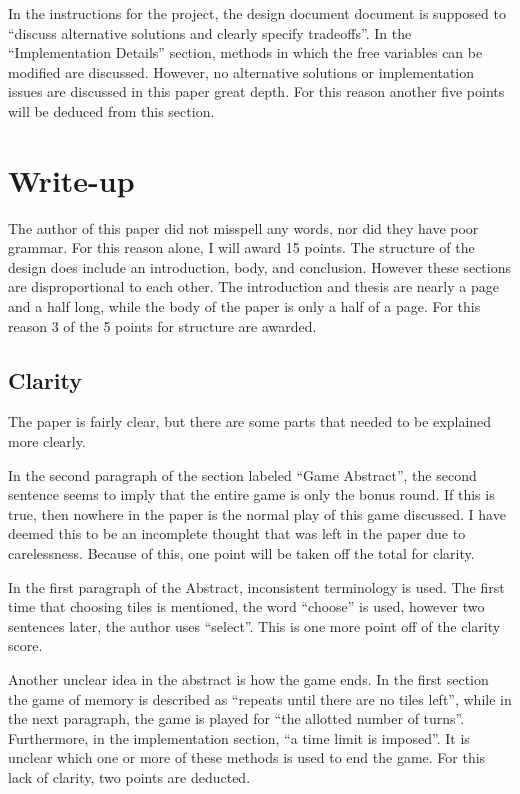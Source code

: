 In the instructions for the project, the design document document is supposed to ``discuss
alternative solutions and clearly specify tradeoffs''.  In the ``Implementation Details'' section,
methods in which the free variables can be modified are discussed.  However, no alternative solutions
or implementation issues are discussed in this paper great depth.  For this reason another five points
will be deduced from this section.


\section{Write-up}
The author of this paper did not misspell any words, nor did they have poor grammar. For this
reason alone, I will award 15 points.  The structure of the design does include an introduction,
body, and conclusion.  However these sections are disproportional to each other.  The
introduction and thesis are nearly a page and a half long, while the body of the paper is only
a half of a page.  For this reason 3 of the 5 points for structure are awarded.

\subsection{Clarity}

The paper is fairly
clear, but there are some parts that needed to be explained more clearly.

In the second paragraph of
the section labeled ``Game Abstract'', the second sentence seems to imply that the entire game
is only the bonus round.  If this is true, then nowhere in the paper is the normal play of this
game discussed.  I have deemed this to be an incomplete thought that was left in the paper due to
carelessness. Because of this, one point will be taken off the total for clarity.

In the first paragraph of
the Abstract, inconsistent terminology is used.  The first time that choosing tiles is mentioned,
the word ``choose'' is used, however two sentences later, the author uses ``select''.  This is
one more point off of the clarity score.

Another unclear idea in the abstract is how the game
ends.  In the first section the game of memory is described as ``repeats until there are no tiles
left'', while in the next paragraph, the game is played for ``the allotted number of turns''.
Furthermore, in the implementation section, ``a time limit is imposed''.  It is unclear which one
or more of these methods is used to end the game. For this lack of clarity, two points are deducted.


